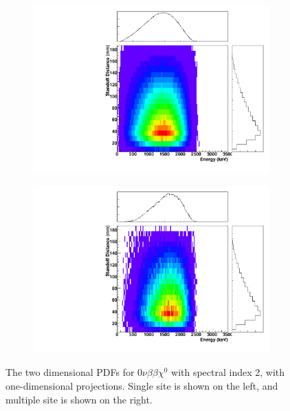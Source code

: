 \documentclass[herrin-thesis.tex]{subfiles}
\begin{document}
\begin{figure}[hp]
\centering
	\begin{subfigure}[b]{0.35\textwidth}
	\centering
	\includegraphics[width=\textwidth]{./plots/PDFs/analysis_pdf_bb0nX2_ss.pdf}
\end{subfigure}\hspace{0.1\textwidth}%
\begin{subfigure}[b]{0.35\textwidth}
	\centering
	\includegraphics[width=1\textwidth]{./plots/PDFs/analysis_pdf_bb0nX2_ms.pdf}
	\end{subfigure}
\caption[PDF for \(0\nu\beta\beta\chi^{0}\)]{The two dimensional PDFs for \(0\nu\beta\beta\chi^{0}\) with spectral index 2, with one-dimensional projections. Single site is shown on the left, and multiple site is shown on the right.}
\label{fig:analysis_pdf_bb0nX2}
\end{figure}
\end{document}

